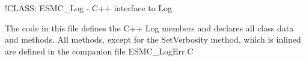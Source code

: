  
\setlength{\parskip}{0pt}
\setlength{\parindent}{0pt}
\setlength{\baselineskip}{11pt}
 
\def\bv{\begin{verbatim}}
\def\ev{\end{verbatim}}
\def\be{\begin{equation}}
\def\ee{\end{equation}}
\def\bea{\begin{eqnarray}}
\def\eea{\end{eqnarray}}
\def\bi{\begin{itemize}}
\def\ei{\end{itemize}}
\def\bn{\begin{enumerate}}
\def\en{\end{enumerate}}
\def\bd{\begin{description}}
\def\ed{\end{description}}
\def\({\left (}
\def\){\right )}
\def\[{\left [}
\def\]{\right ]}
\def\<{\left  \langle}
\def\>{\right \rangle}
\def\cI{{\cal I}}
\def\diag{\mathop{\rm diag}}
\def\tr{\mathop{\rm tr}}


 

  !CLASS: ESMC\_Log - C++ interface to Log
  
  
   The code in this file defines the C++ Log members and declares all class
   data and methods.  All methods, except for the SetVerbosity method, which is
   inlined are defined in the companion file ESMC\_LogErr.C
  
